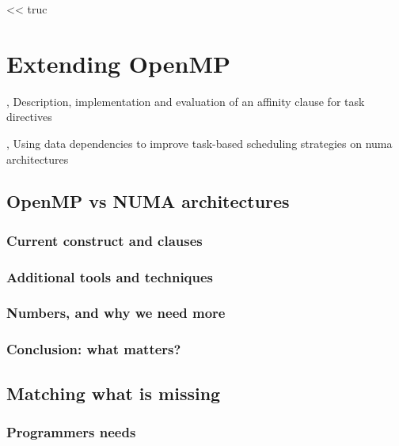 
\begin{savequote}[6cm]
<< truc
\end{savequote}

\chapter{Extending OpenMP}\label{chap:contrib:openmp}
\chaptertoc


%



\cite{Virouleau2016}, Description, implementation and evaluation of an affinity clause for task directives

\cite{Virouleau2016b}, Using data dependencies to improve task-based scheduling strategies on numa architectures


\section{OpenMP vs NUMA architectures}

\subsection{Current construct and clauses}
\subsection{Additional tools and techniques}
\subsection{Numbers, and why we need more}
\subsection{Conclusion: what matters?}

\section{Matching what is missing}
\subsection{Programmers needs}
